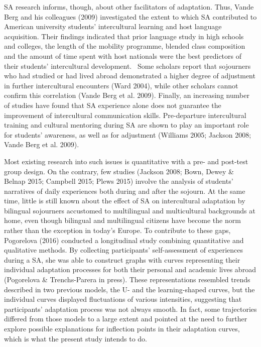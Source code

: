 \documentclass[12pt]{article}
\newenvironment{styleStandard}{\setlength\leftskip{0cm}\setlength\rightskip{0cm plus 1fil}\setlength\parindent{0cm}\setlength\parfillskip{0pt plus 1fil}\setlength\parskip{0in plus 1pt}\writerlistparindent\writerlistleftskip\leavevmode\normalfont\normalsize\writerlistlabel\ignorespaces}{\unskip\vspace{0.111in plus 0.0111in}\par}
\newcommand\writerlistleftskip{}
\newcommand\writerlistparindent{}
\newcommand\writerlistlabel{}
\begin{document}
\begin{styleStandard}
SA research informs, though, about other facilitators of adaptation. Thus, Vande Berg and his colleagues (2009) investigated the extent to which SA contributed to American university students’ intercultural learning and host language acquisition. Their findings indicated that prior language study in high schools and colleges, the length of the mobility programme, blended class composition and the amount of time spent with host nationals were the best predictors of their students’ intercultural development. \ Some scholars report that sojourners who had studied or had lived abroad demonstrated a higher degree of adjustment in further intercultural encounters (Ward 2004), while other scholars cannot confirm this correlation (Vande Berg et al. 2009). Finally, an increasing number of studies have found that SA experience alone does not guarantee the improvement of intercultural communication skills. Pre-departure intercultural training and cultural mentoring during SA are shown to play an important role for students’ awareness, as well as for adjustment (Williams 2005; Jackson 2008; Vande Berg et al. 2009).
\end{styleStandard}

\begin{styleStandard}
Most existing research into such issues is quantitative with a pre- and post-test group design. On the contrary, few studies (Jackson 2008; Bown, Dewey \& Belnap 2015; Campbell 2015; Plews 2015) involve the analysis of students’ narratives of daily experiences both during and after the sojourn. At the same time, little is still known about the effect of SA on intercultural adaptation by bilingual sojourners accustomed to multilingual and multicultural backgrounds at home, even though bilingual and multilingual citizens have become the norm rather than the exception in today’s Europe. To contribute to these gaps, Pogorelova (2016) conducted a longitudinal study combining quantitative and qualitative methods. By collecting participants’ self-assessment of experiences during a SA, she was able to construct graphs with curves representing their individual adaptation processes for both their personal and academic lives abroad (Pogorelova \& Trenchs-Parera in press). These representations resembled trends described in two previous models, the U- and the learning-shaped curves, but the individual curves displayed fluctuations of various intensities, suggesting that participants’ adaptation process was not always smooth. In fact, some trajectories differed from those models to a large extent and pointed at the need to further explore possible explanations for inflection points in their adaptation curves, which is what the present study intends to do. \ 
\end{styleStandard}
\end{document}

